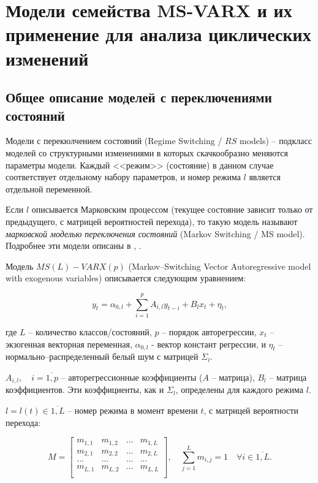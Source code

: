 \documentclass[a4paper,14pt]{extreport}
\begin{document}
	
	\section{Модели семейства MS-VARX и их применение для анализа циклических изменений}
	
	\subsection{Общее описание моделей с переключениями состояний}
	Модели с перекюлчением состояний (Regime Switching / $RS$ models) – подкласс моделей со структурными изменениями в которых скачкообразно меняются параметры модели. Каждый <<режим>> (состояние) в данном случае соответствует отдельному набору параметров, и номер режима $l$ является отдельной переменной.
	
	Если $l$ описывается Марковским процессом (текущее состояние зависит только от предыдущего, с матрицей вероятностей перехода), то такую модель называют \textit{марковской моделью переключения состояний} (Markov Switching / MS model). Подробнее эти модели описаны в \cite{malNovopMSVARX}, \cite{mal_methods_nonconstant}.
	
	Модель $MS(L)-VARX(p)$ (Markov–Switching Vector Autoregressive model with exogenous variables) описывается следующим уравнением:
	
	\begin{equation}
	y_{t} = \alpha_{0,l} + \sum_{i=1}^{p} A_{i,l} y_{t-i} + B_{l} x_{t} + \eta_{t},
	\end{equation}
	
	где $L$ – количество классов/состояний, $p$ – порядок авторегрессии, $x_{t}$ – экзогенная векторная переменная, $\alpha_{0,l}$ - вектор констант регрессии, и $\eta_{t}$ – нормально–распределенный белый шум с матрицей $\Sigma_{l}$.
	
	$A_{i,l}, \quad i = \overline{1,p} $ – авторегрессионные коэффициенты ($A$ – матрица), $B_{l}$ – матрица коэффициентов. Эти коэффициенты, как и $\Sigma_{l}$, определены для каждого режима $l$.
	
	$l=l(t) \in \overline{1,L}$ – номер режима в момент времени $t$, с матрицей вероятности перехода:
	
	\begin{equation}
	\label{eq:M_matrix}
	M=
	\left[ {\begin{array}{cccc}
		m_{1,1} & m_{1,2} & ... & m_{1,L} \\
		m_{2,1} & m_{2,2} & ... & m_{2,L} \\
		... & ... & ... & ... \\
		m_{L,1} & m_{L,2} & ... & m_{L,L} \\
		\end{array} } \right]
	, \quad
	\sum_{j=1}^{L} m_{i,j} = 1 \quad \forall i \in \overline{1,L}.
	\end{equation}
	
\end{document}
